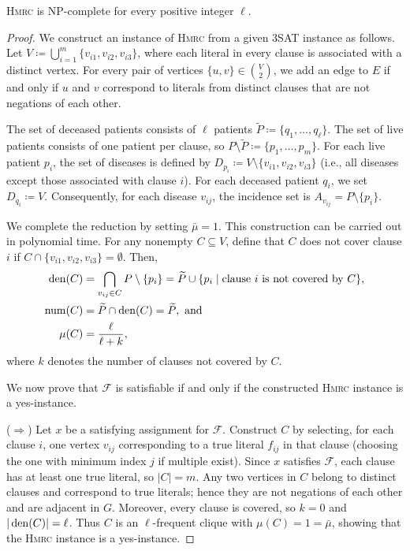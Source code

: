 \begin{theorem}\label{thm.HMRCP_NPC}
    \textsc{Hmrc} is NP-complete for every positive integer $\ell$.
\end{theorem}
\begin{proof}
    We construct an instance of \textsc{Hmrc} from a given 3SAT instance as follows. Let $V \coloneqq \bigcup_{i=1}^m\{v_{i1}, v_{i2}, v_{i3}\}$, where each literal in every clause is associated with a distinct vertex. For every pair of vertices $\{u,v\} \in \binom{V}{2}$, we add an edge to $E$ if and only if $u$ and $v$ correspond to literals from distinct clauses that are not negations of each other.

    The set of deceased patients consists of $\ell$ patients $\widetilde{P} \coloneqq \{q_1,\ldots,q_\ell\}$. The set of live patients consists of one patient per clause, so $P\setminus \widetilde{P} \coloneqq \{p_1, \ldots, p_m\}$. For each live patient $p_i$, the set of diseases is defined by $D_{p_i} \coloneqq V \setminus \{v_{i1}, v_{i2}, v_{i3}\}$ (i.e., all diseases except those associated with clause $i$). For each deceased patient $q_i$, we set $D_{q_i} \coloneqq V$. Consequently, for each disease $v_{ij}$, the incidence set is $A_{v_{ij}} = P \setminus \{p_i\}$.

    We complete the reduction by setting $\bar \mu = 1$. This construction can be carried out in polynomial time. For any nonempty $C \subseteq V$, define that $C$ does not cover clause $i$ if $C \cap \{v_{i1}, v_{i2}, v_{i3}\} = \emptyset$. Then,
    \begin{align*}
        \operatorname*{den}(C) &= \bigcap\limits_{v_{ij}\in C}P\setminus\{p_i\} = \widetilde{P} \cup \{p_i \mid \text{clause } i \text{ is not covered by } C\}, \\
        \operatorname*{num}(C) &= \widetilde{P} \cap \operatorname*{den}(C) = \widetilde{P}, \text{ and}\\
        \mu(C) &= \frac{\ell}{\ell+k},
    \end{align*}
    where $k$ denotes the number of clauses not covered by $C$.

    We now prove that $\mathcal{F}$ is satisfiable if and only if the constructed \textsc{Hmrc} instance is a yes-instance.

    ($\Rightarrow$) Let $x$ be a satisfying assignment for $\mathcal{F}$. Construct $C$ by selecting, for each clause $i$, one vertex $v_{ij}$ corresponding to a true literal $f_{ij}$ in that clause (choosing the one with minimum index $j$ if multiple exist). Since $x$ satisfies $\mathcal{F}$, each clause has at least one true literal, so $|C| = m$. Any two vertices in $C$ belong to distinct clauses and correspond to true literals; hence they are not negations of each other and are adjacent in $G$. Moreover, every clause is covered, so $k=0$ and $|\operatorname*{den}(C)| = \ell$. Thus $C$ is an $\ell$-frequent clique with $\mu(C) = 1 = \bar \mu$, showing that the \textsc{Hmrc} instance is a yes-instance.


\end{proof}

